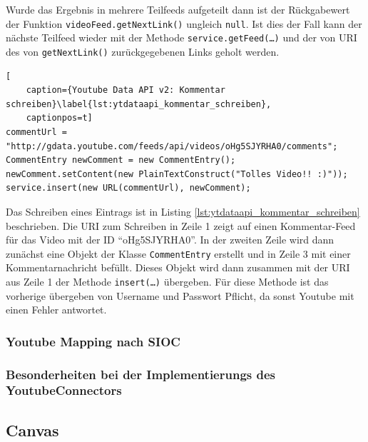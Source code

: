 Wurde das Ergebnis in mehrere Teilfeeds aufgeteilt dann ist der Rückgabewert der Funktion \texttt{videoFeed.getNextLink()} ungleich \texttt{null}. Ist dies der Fall kann der nächste Teilfeed wieder mit der Methode \texttt{service.getFeed(\dots)} und der von URI des von \texttt{getNextLink()} zurückgegebenen Links geholt werden.

\begin{lstlisting}[
    caption={Youtube Data API v2: Kommentar schreiben}\label{lst:ytdataapi_kommentar_schreiben},
    captionpos=t]
commentUrl = "http://gdata.youtube.com/feeds/api/videos/oHg5SJYRHA0/comments";
CommentEntry newComment = new CommentEntry();
newComment.setContent(new PlainTextConstruct("Tolles Video!! :)"));
service.insert(new URL(commentUrl), newComment);
\end{lstlisting}

Das Schreiben eines Eintrags ist in Listing \ref{lst:ytdataapi_kommentar_schreiben} beschrieben. Die URI zum Schreiben in Zeile 1 zeigt auf einen Kommentar-Feed für das Video mit der ID \enquote{oHg5SJYRHA0}. In der zweiten Zeile wird dann zunächst eine Objekt der Klasse \texttt{CommentEntry} erstellt und in Zeile 3 mit einer Kommentarnachricht befüllt. Dieses Objekt wird dann zusammen mit der URI aus Zeile 1 der Methode \texttt{insert(\dots)} übergeben. Für diese Methode ist das vorherige übergeben von Username und Passwort Pflicht, da sonst Youtube mit einen Fehler antwortet.

\subsubsection{Youtube Mapping nach SIOC} %
\label{ssub:youtube_mapping_nach_sioc}


\subsubsection{Besonderheiten bei der Implementierungs des YoutubeConnectors} %
\label{ssub:besonderheiten_bei_der_implementierungs_des_youtubeconnectors}




\subsection{Canvas} %
\label{sub:canvas_connector}

